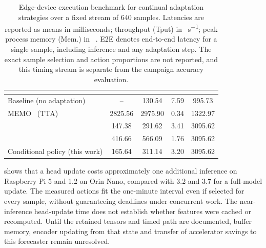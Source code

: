 \begin{table}[!t]
\caption[Execution benchmark for continual adaptation strategies.]{Edge-device execution benchmark for continual adaptation strategies over a fixed stream of 640 samples. Latencies are reported as means in milliseconds; throughput (Tput) in \si{\sample\per\second}; peak process memory (Mem.) in \si{\mega\byte}. E2E denotes end-to-end latency for a single sample, including inference and any adaptation step. The exact sample selection and action proportions are not reported, and this timing stream is separate from the campaign accuracy evaluation.}
\label{tab:ch4-solar-edge-benchmark}
\centering
\small
\TableNormal
\begin{tabular}{l S[table-format=4.2] S[table-format=4.2] S[table-format=1.2] S[table-format=4.2]}
\toprule
{} &  &  &  & \\
\midrule
Baseline (no adaptation) &  & 130.54 & 7.59 & 995.73\\
MEMO~\cite{NEURIPS2022memo} (TTA) & 2825.56 & 2975.90 & 0.34 & 1322.97\\
\citet{8397688} & 147.38 & 291.62 & 3.41 & 3095.62\\
\citet{LARABENITEZ2023126312} & 416.66 & 566.09 & 1.76 & 3095.62\\
Conditional policy (this work) & 165.64 & 311.14 & 3.20 & 3095.62\\
\bottomrule
\end{tabular}
\end{table}


 shows that a head update costs approximately one additional inference on Raspberry Pi 5 and \num{1.2} on Orin Nano, compared with \num{3.2} and \num{3.7} for a full-model update. The measured actions fit the one-minute interval even if selected for every sample, without guaranteeing deadlines under concurrent work. The near-inference head-update time does not establish whether features were cached or recomputed. Until the retained tensors and timed path are documented, buffer memory, encoder updating from that state and transfer of accelerator savings to this forecaster remain unresolved.

